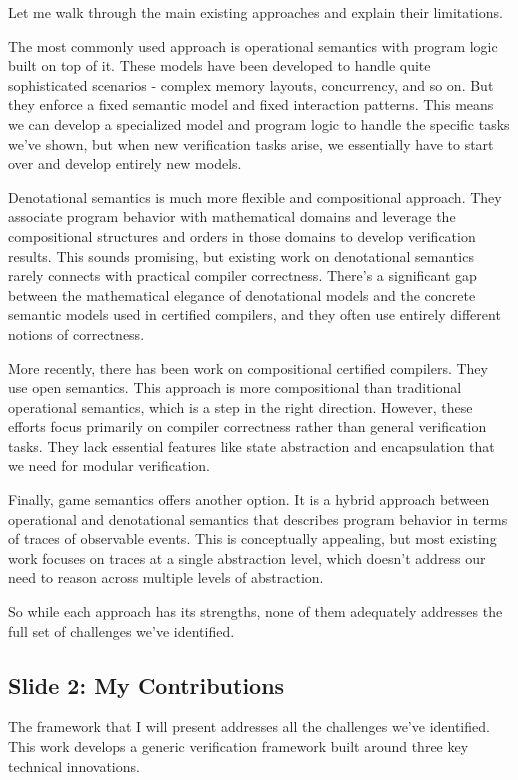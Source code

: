 \documentclass{article}
\begin{document}
Let me walk through the main existing approaches and explain their limitations.

The most commonly used approach is operational semantics with program logic
built on top of it. These models have been developed to handle quite
sophisticated scenarios - complex memory layouts, concurrency, and so on. But
they enforce a fixed semantic model and fixed interaction patterns. This means
we can develop a specialized model and program logic to handle the specific
tasks we've shown, but when new verification tasks arise, we essentially have to
start over and develop entirely new models.

Denotational semantics is much more flexible and compositional approach. They
associate program behavior with mathematical domains and leverage the
compositional structures and orders in those domains to develop verification
results. This sounds promising, but existing work on denotational semantics
rarely connects with practical compiler correctness. There's a significant gap
between the mathematical elegance of denotational models and the concrete
semantic models used in certified compilers, and they often use entirely
different notions of correctness.

More recently, there has been work on compositional certified compilers. They
use open semantics. This approach is more compositional than traditional
operational semantics, which is a step in the right direction. However, these
efforts focus primarily on compiler correctness rather than general verification
tasks. They lack essential features like state abstraction and encapsulation
that we need for modular verification.

Finally, game semantics offers another option. It is a hybrid
approach between operational and denotational semantics that describes program
behavior in terms of traces of observable events. This is conceptually
appealing, but most existing work focuses on traces at a single abstraction
level, which doesn't address our need to reason across multiple levels of
abstraction.

So while each approach has its strengths, none of them adequately addresses the
full set of challenges we've identified.

\subsection{Slide 2: My Contributions}

The framework that I will present addresses all the challenges we've identified.
This work develops a generic verification framework built around three key
technical innovations.
\end{document}
